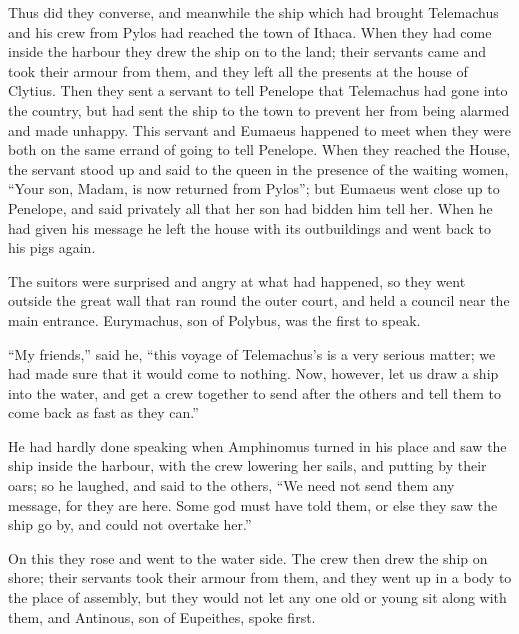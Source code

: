 Thus did they converse, and meanwhile the ship which had brought Telemachus and
his crew from Pylos had reached the town of Ithaca. When they had come inside
the harbour they drew the ship on to the land; their servants came and took
their armour from them, and they left all the presents at the house of Clytius.
Then they sent a servant to tell Penelope that Telemachus had gone into the
country, but had sent the ship to the town to prevent her from being alarmed
and made unhappy. This servant and Eumaeus happened to meet when they were both
on the same errand of going to tell Penelope. When they reached the House, the
servant stood up and said to the queen in the presence of the waiting women,
“Your son, Madam, is now returned from Pylos”; but Eumaeus went close up to
Penelope, and said privately all that her son had bidden him tell her. When he
had given his message he left the house with its outbuildings and went back to
his pigs again.

The suitors were surprised and angry at what had happened, so they went outside
the great wall that ran round the outer court, and held a council near the main
entrance. Eurymachus, son of Polybus, was the first to speak.

“My friends,” said he, “this voyage of Telemachus’s is a very serious matter;
we had made sure that it would come to nothing. Now, however, let us draw a
ship into the water, and get a crew together to send after the others and tell
them to come back as fast as they can.”

He had hardly done speaking when Amphinomus turned in his place and saw the
ship inside the harbour, with the crew lowering her sails, and putting by their
oars; so he laughed, and said to the others, “We need not send them any
message, for they are here. Some god must have told them, or else they saw the
ship go by, and could not overtake her.”

On this they rose and went to the water side. The crew then drew the ship on
shore; their servants took their armour from them, and they went up in a body
to the place of assembly, but they would not let any one old or young sit along
with them, and Antinous, son of Eupeithes, spoke first.

